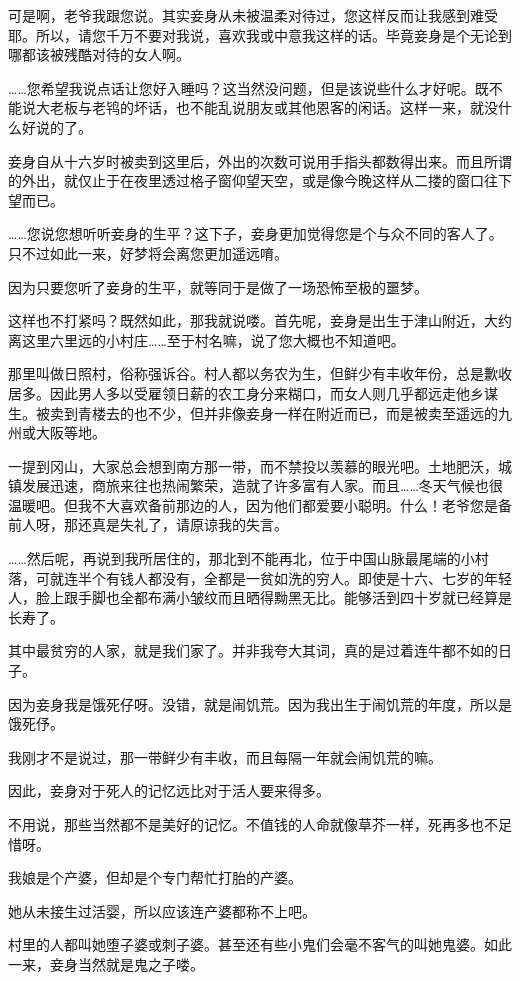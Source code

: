 \documentclass[portrait,a4paper]{article}
\begin{document}
可是啊，老爷我跟您说。其实妾身从未被温柔对待过，您这样反而让我感到难受耶。所以，请您千万不要对我说，喜欢我或中意我这样的话。毕竟妾身是个无论到哪都该被残酷对待的女人啊。

……您希望我说点话让您好入睡吗？这当然没问题，但是该说些什么才好呢。既不能说大老板与老鸨的坏话，也不能乱说朋友或其他恩客的闲话。这样一来，就没什么好说的了。

妾身自从十六岁时被卖到这里后，外出的次数可说用手指头都数得出来。而且所谓的外出，就仅止于在夜里透过格子窗仰望天空，或是像今晚这样从二搂的窗口往下望而已。

……您说您想听听妾身的生平？这下子，妾身更加觉得您是个与众不同的客人了。只不过如此一来，好梦将会离您更加遥远唷。

因为只要您听了妾身的生平，就等同于是做了一场恐怖至极的噩梦。

这样也不打紧吗？既然如此，那我就说喽。首先呢，妾身是出生于津山附近，大约离这里六里远的小村庄……至于村名嘛，说了您大概也不知道吧。

那里叫做日照村，俗称强诉谷。村人都以务农为生，但鲜少有丰收年份，总是歉收居多。因此男人多以受雇领日薪的农工身分来糊口，而女人则几乎都远走他乡谋生。被卖到青楼去的也不少，但并非像妾身一样在附近而已，而是被卖至遥远的九州或大阪等地。

一提到冈山，大家总会想到南方那一带，而不禁投以羡慕的眼光吧。土地肥沃，城镇发展迅速，商旅来往也热闹繁荣，造就了许多富有人家。而且……冬天气候也很温暖吧。但我不大喜欢备前那边的人，因为他们都爱要小聪明。什么！老爷您是备前人呀，那还真是失礼了，请原谅我的失言。

……然后呢，再说到我所居住的，那北到不能再北，位于中国山脉最尾端的小村落，可就连半个有钱人都没有，全都是一贫如洗的穷人。即使是十六、七岁的年轻人，脸上跟手脚也全都布满小皱纹而且晒得黝黑无比。能够活到四十岁就已经算是长寿了。

其中最贫穷的人家，就是我们家了。并非我夸大其词，真的是过着连牛都不如的日子。

因为妾身我是饿死仔呀。没错，就是闹饥荒。因为我出生于闹饥荒的年度，所以是饿死伃。

我刚才不是说过，那一带鲜少有丰收，而且每隔一年就会闹饥荒的嘛。

因此，妾身对于死人的记忆远比对于活人要来得多。

不用说，那些当然都不是美好的记忆。不值钱的人命就像草芥一样，死再多也不足惜呀。

我娘是个产婆，但却是个专门帮忙打胎的产婆。

她从未接生过活婴，所以应该连产婆都称不上吧。

村里的人都叫她堕子婆或刺子婆。甚至还有些小鬼们会毫不客气的叫她鬼婆。如此一来，妾身当然就是鬼之子喽。
\end{document}
